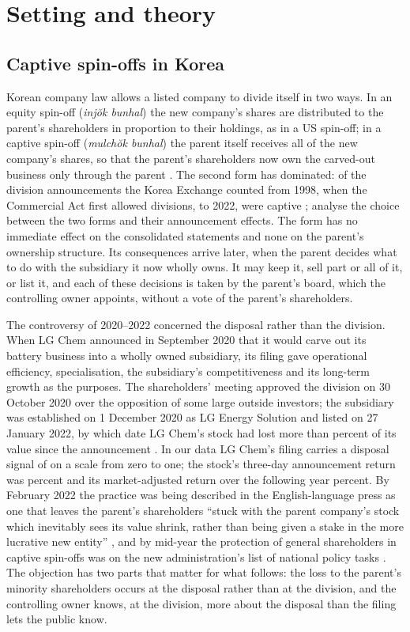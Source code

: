 \section{Setting and theory}\label{sec:setting}

\subsection{Captive spin-offs in Korea}\label{sec:captive}

Korean company law allows a listed company to divide itself in two ways. In an equity spin-off (\emph{injŏk bunhal}) the new company's shares are distributed to the parent's shareholders in proportion to their holdings, as in a US spin-off; in a captive spin-off (\emph{mulchŏk bunhal}) the parent itself receives all of the new company's shares, so that the parent's shareholders now own the carved-out business only through the parent \cite{kang2025}. The second form has dominated: of the \KLKrxTotal{} division announcements the Korea Exchange counted from 1998, when the Commercial Act first allowed divisions, to 2022, \KLKrxCaptive{} were captive \cite{kang2025};  analyse the choice between the two forms and their announcement effects. The form has no immediate effect on the consolidated statements and none on the parent's ownership structure. Its consequences arrive later, when the parent decides what to do with the subsidiary it now wholly owns. It may keep it, sell part or all of it, or list it, and each of these decisions is taken by the parent's board, which the controlling owner appoints, without a vote of the parent's shareholders.

The controversy of 2020--2022 concerned the disposal rather than the division. When LG Chem announced in September 2020 that it would carve out its battery business into a wholly owned subsidiary, its filing gave operational efficiency, specialisation, the subsidiary's competitiveness and its long-term growth as the purposes. The shareholders' meeting approved the division on 30 October 2020 over the opposition of some large outside investors; the subsidiary was established on 1 December 2020 as LG Energy Solution and listed on 27 January 2022, by which date LG Chem's stock had lost more than \KLLGDrop{} percent of its value since the announcement \cite{kang2025}. In our data LG Chem's filing carries a disposal signal of \LGScore{} on a scale from zero to one; the stock's three-day announcement return was \LGAnnCar{} percent and its market-adjusted return over the following year \LGBhar{} percent. By February 2022 the practice was being described in the English-language press as one that leaves the parent's shareholders ``stuck with the parent company's stock which inevitably sees its value shrink, rather than being given a stake in the more lucrative new entity'' \cite{park2022}, and by mid-year the protection of general shareholders in captive spin-offs was on the new administration's list of national policy tasks \cite{fsc2022a}. The objection has two parts that matter for what follows: the loss to the parent's minority shareholders occurs at the disposal rather than at the division, and the controlling owner knows, at the division, more about the disposal than the filing lets the public know.

